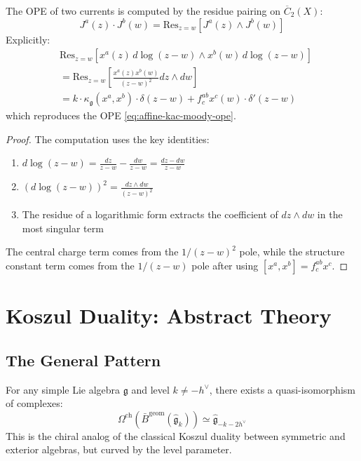 \begin{theorem}\label{thm:geometric-ope-kac-moody}
The OPE of two currents is computed by the residue pairing on $\overline{C}_2(X)$:
\begin{equation}
J^a(z) \cdot J^b(w) = \mathrm{Res}_{z=w}\left[J^a(z) \wedge J^b(w)\right]
\end{equation}
Explicitly:
\begin{align}
&\mathrm{Res}_{z=w}\left[x^a(z) \, d\log(z-w) \wedge x^b(w) \, d\log(z-w)\right] \\
&= \mathrm{Res}_{z=w}\left[\frac{x^a(z) x^b(w)}{(z-w)^2} dz \wedge dw\right] \\
&= k \cdot \kappa_{\mathfrak{g}}(x^a,x^b) \cdot \delta(z-w) + f^{ab}_c x^c(w) \cdot \delta'(z-w)
\end{align}
which reproduces the OPE \eqref{eq:affine-kac-moody-ope}.
\end{theorem}

\begin{proof}
The computation uses the key identities:
\begin{enumerate}
\item $d\log(z-w) = \frac{dz}{z-w} - \frac{dw}{z-w} = \frac{dz-dw}{z-w}$
\item $(d\log(z-w))^2 = \frac{dz \wedge dw}{(z-w)^2}$
\item The residue of a logarithmic form extracts the coefficient of $dz \wedge dw$ in the most singular term
\end{enumerate}
The central charge term comes from the $1/(z-w)^2$ pole, while the structure constant term comes from the $1/(z-w)$ pole after using $[x^a, x^b] = f^{ab}_c x^c$.
\end{proof}

\section{Koszul Duality: Abstract Theory}

\subsection{The General Pattern}

\begin{theorem}\label{thm:level-shifting-abstract}
For any simple Lie algebra $\mathfrak{g}$ and level $k \neq -h^\vee$, there exists a quasi-isomorphism of complexes:
\begin{equation}
\Omega^{\mathrm{ch}}(\bar{B}^{\mathrm{geom}}(\widehat{\mathfrak{g}}_k)) \simeq \widehat{\mathfrak{g}}_{-k-2h^\vee}
\end{equation}
This is the chiral analog of the classical Koszul duality between symmetric and exterior algebras, but curved by the level parameter.
\end{theorem}

